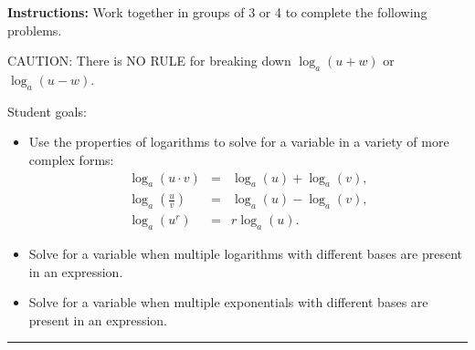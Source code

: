 



\noindent \textbf{Instructions:}  Work together in groups of  3 or 4 to complete the following problems.

\noindent CAUTION: There is NO RULE for breaking down $\log_a(u+w)$ or $\log_a(u-w)$.  

Student goals:
\begin{itemize}
\item Use the properties of logarithms to solve for a variable in a
  variety of more complex forms:
  \begin{eqnarray*}
    \log_a(u\cdot v) & = & \log_a(u) + \log_a(v), \\
    \log_a\left(\frac{u}{v}\right) & = & \log_a(u) - \log_a(v), \\
    \log_a\left(u^r\right) & = & r\log_a(u).
  \end{eqnarray*}
\item Solve for a variable when multiple logarithms with different
  bases are present in an expression.
\item Solve for a variable when multiple exponentials with different
  bases are present in an expression.
\end{itemize}

\hrule

